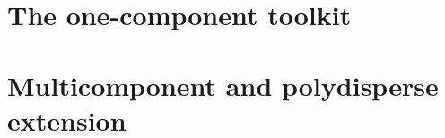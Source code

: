 \part{The one-component toolkit}


\clearpage
\part{Multicomponent and polydisperse extension}


\clearpage




